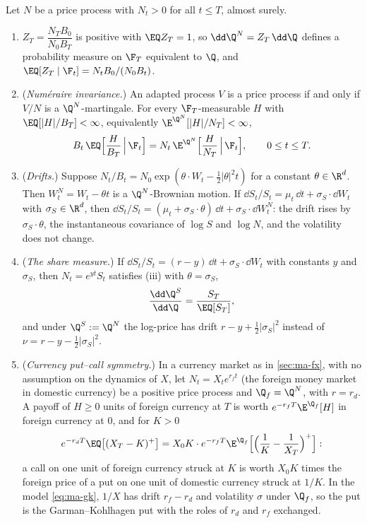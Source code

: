 \begin{proposition}\label{prop:ma-numeraire}
Let $N$ be a price process with $N_t>0$ for all $t\le T$, almost surely.
\begin{enumerate}[label=(\roman*)]
  \item $Z_T=\dfrac{N_TB_0}{N_0B_T}$ is positive with $\EQ Z_T=1$, so
    $\dd\Q^N=Z_T\,\dd\Q$ defines a probability measure on $\F_T$ equivalent to $\Q$, and
    $\EQ[Z_T\mid\F_t]=N_tB_0/(N_0B_t)$.
  \item (\emph{Num\'eraire invariance.}) An adapted process $V$ is a price process if and only
    if $V/N$ is a $\Q^N$-martingale. For every $\F_T$-measurable $H$ with
    $\EQ[|H|/B_T]<\infty$, equivalently $\E^{\Q^N}[|H|/N_T]<\infty$,
    \[
      B_t\,\EQ\Big[\frac{H}{B_T}\,\Big|\,\F_t\Big]=N_t\,\E^{\Q^N}\Big[\frac{H}{N_T}\,\Big|\,\F_t\Big],
      \qquad0\le t\le T .
    \]
  \item (\emph{Drifts.}) Suppose $N_t/B_t=N_0\exp(\theta\cdot W_t-\frac12|\theta|^2t)$ for a
    constant $\theta\in\R^d$. Then $W^N_t=W_t-\theta t$ is a $\Q^N$-Brownian motion. If
    $\dd S_t/S_t=\mu_t\,\dd t+\sigma_S\cdot\dd W_t$ with $\sigma_S\in\R^d$, then
    $\dd S_t/S_t=(\mu_t+\sigma_S\cdot\theta)\,\dd t+\sigma_S\cdot\dd W^N_t$: the drift rises by
    $\sigma_S\cdot\theta$, the instantaneous covariance of $\log S$ and $\log N$, and the
    volatility does not change.
  \item (\emph{The share measure.}) If $\dd S_t/S_t=(r-y)\,\dd t+\sigma_S\cdot\dd W_t$ with
    constants $y$ and $\sigma_S$, then $N_t=e^{yt}S_t$ satisfies (iii) with $\theta=\sigma_S$,
    \[
      \frac{\dd\Q^S}{\dd\Q}=\frac{S_T}{\EQ[S_T]},
    \]
    and under $\Q^S:=\Q^N$ the log-price has drift $r-y+\frac12|\sigma_S|^2$ instead of
    $\nu=r-y-\frac12|\sigma_S|^2$.
  \item (\emph{Currency put--call symmetry.}) In a currency market as in \cref{sec:ma-fx},
    with no assumption on the dynamics of $X$, let $N_t=X_te^{r_ft}$ (the foreign money market
    in domestic currency) be a positive price process and $\Q_f=\Q^N$, with $r=r_d$. A payoff of
    $H\ge0$ units of foreign currency at $T$ is worth $e^{-r_fT}\E^{\Q_f}[H]$ in foreign currency
    at $0$, and for $K>0$
    \[
      e^{-r_dT}\EQ\big[(X_T-K)^+\big]=X_0K\cdot e^{-r_fT}\E^{\Q_f}\Big[\Big(\frac1K-\frac1{X_T}\Big)^+\Big]:
    \]
    a call on one unit of foreign currency struck at $K$ is worth $X_0K$ times the foreign
    price of a put on one unit of domestic currency struck at $1/K$. In the model
    \eqref{eq:ma-gk}, $1/X$ has drift $r_f-r_d$ and volatility $\sigma$ under $\Q_f$, so the
    put is the Garman--Kohlhagen put with the roles of $r_d$ and $r_f$ exchanged.
\end{enumerate}
\end{proposition}

